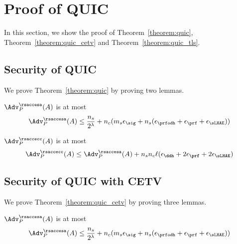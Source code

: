 \section{Proof of QUIC} \label{app:secquic}

In this section, we show the proof of Theorem~\ref{theorem:quic}, Theorem~\ref{theorem:quic_cetv} and Theorem~\ref{theorem:quic_tls}.

\subsection{Security of QUIC} \label{app:quic}

We prove Theorem~\ref{theorem:quic} by proving two lemmas.

\begin{lemma} \label{lemma:quic_rsacce-sa}
 $\Adv^{\rsaccesa}_{P}(A)$ is at most
 \begin{equation}
  \Adv^{\rsaccesa}_{P}(A) \leq \frac{n_s}{2^{\lambda}} + n_c(m_s \epsilon_{\sig} + n_s(\epsilon_{\prfodh} + \epsilon_{\prf} + \epsilon_{\sLHAE}))
 \end{equation}
\end{lemma}
%


\begin{lemma} \label{lemma:quic_rsacce-cc}
 $\Adv^{\rsaccecc}_{P}(A)$ is at most
 \begin{equation}
  \Adv^{\rsaccecc}_{P}(A) \leq \Adv^{\rsaccesa}_{P}(A) + n_sn_c\ell(\epsilon_{\ddh} + 2\epsilon_{\prf} + 2\epsilon_{\sLHAE})
 \end{equation}
\end{lemma}
%



\subsection{Security of QUIC with CETV} \label{app:quic_cetv}

We prove Theorem~\ref{theorem:quic_cetv} by proving three lemmas.
\begin{lemma} \label{lemma:quic_cetv_rsacce-sa}
 $\Adv^{\rsaccesa}_{P}(A)$ is at most
 \begin{equation}
  \Adv^{\rsaccesa}_{P}(A) \leq \frac{n_s}{2^{\lambda}} + n_c(m_s \epsilon_{\sig} + n_s(\epsilon_{\prfodh} + \epsilon_{\prf} + \epsilon_{\sLHAE}))
 \end{equation}
\end{lemma}
%



